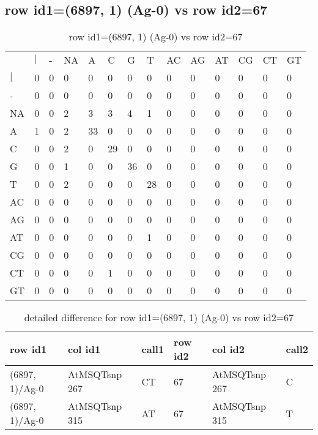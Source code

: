 \subsection{row id1=(6897, 1) (Ag-0) vs row id2=67}
\begin{center}
\begin{longtable}{|l|l|l|l|l|l|l|l|l|l|l|l|l|l|}
\caption{row id1=(6897, 1) (Ag-0) vs row id2=67} \label{table_dm60}\\
\hline
\\
\hline
&$|$&-&NA&A&C&G&T&AC&AG&AT&CG&CT&GT\\
$|$&0&0&0&0&0&0&0&0&0&0&0&0&0\\
-&0&0&0&0&0&0&0&0&0&0&0&0&0\\
NA&0&0&2&3&3&4&1&0&0&0&0&0&0\\
A&1&0&2&33&0&0&0&0&0&0&0&0&0\\
C&0&0&2&0&29&0&0&0&0&0&0&0&0\\
G&0&0&1&0&0&36&0&0&0&0&0&0&0\\
T&0&0&2&0&0&0&28&0&0&0&0&0&0\\
AC&0&0&0&0&0&0&0&0&0&0&0&0&0\\
AG&0&0&0&0&0&0&0&0&0&0&0&0&0\\
AT&0&0&0&0&0&0&1&0&0&0&0&0&0\\
CG&0&0&0&0&0&0&0&0&0&0&0&0&0\\
CT&0&0&0&0&1&0&0&0&0&0&0&0&0\\
GT&0&0&0&0&0&0&0&0&0&0&0&0&0\\
\hline
\end{longtable}
\end{center}

\begin{center}
\begin{longtable}{|l|l|l|l|l|l|}
\caption{detailed difference for row id1=(6897, 1) (Ag-0) vs row id2=67} \label{table_dm61}\\
\hline
row id1&col id1&call1&row id2&col id2&call2\\
\hline
(6897, 1)/Ag-0&AtMSQTsnp 267&CT&67&AtMSQTsnp 267&C\\
(6897, 1)/Ag-0&AtMSQTsnp 315&AT&67&AtMSQTsnp 315&T\\
\hline
\end{longtable}
\end{center}

